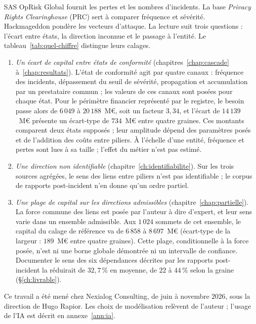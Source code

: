 \begin{samepage}
SAS OpRisk Global fournit les pertes et les nombres d'incidents. La base \emph{Privacy Rights
Clearinghouse} (PRC) sert à comparer fréquence et sévérité. Hackmageddon pondère les vecteurs
d'attaque. La lecture suit trois questions : l'écart entre états, la direction inconnue et
le passage à l'entité. Le tableau~\ref{tab:quel-chiffre} distingue leurs calages.\par
\end{samepage}

\begin{enumerate}[leftmargin=*,nosep]
\item \emph{Un écart de capital entre états de conformité} (chapitres~\ref{chap:cascade} à~\ref{chap:resultats}). L'état de conformité agit par quatre canaux : fréquence des incidents,
dépassement du seuil de sévérité, propagation et accumulation par un prestataire commun ; les
valeurs de ces canaux sont posées pour chaque état. Pour le périmètre financier représenté par le
registre, le besoin
passe alors de $6\,049$ à $20\,188$~M\euro{}, soit un facteur $3{,}34$, et l'écart de
$14\,139$~M\euro{} présente un écart-type de $734$~M\euro{} entre quatre graines. Ces montants
comparent deux états supposés ; leur amplitude dépend des paramètres posés et de l'addition des
coûts entre piliers. À l'échelle d'une entité, fréquence et pertes sont
lues à sa taille ; l'effet du métier n'est pas estimé.
\item \emph{Une direction non identifiable} (chapitre~\ref{ch:identifiabilite}). Sur les trois sources agrégées, le sens des liens entre piliers
n'est pas identifiable ; le corpus de rapports post-incident n'en
donne qu'un ordre partiel.
\item \emph{Une plage de capital sur les directions admissibles} (chapitre~\ref{chap:partielle}). La force commune des liens est
posée par l'auteur à dire d'expert, et leur sens varie dans un ensemble admissible. Aux $1\,024$ sommets de cet
ensemble, le capital du calage de référence va de $6\,858$ à $8\,697$~M\euro{} (écart-type de la
largeur : $189$~M\euro{} entre quatre graines). Cette plage, conditionnelle à la force posée, n'est
ni une borne globale démontrée ni un intervalle de confiance. Documenter le sens des six
dépendances décrites par les rapports post-incident la réduirait de $32{,}7\,\%$ en moyenne, de
$22$ à $44\,\%$ selon la graine (\S\ref{ch:livrable}).
\end{enumerate}

Ce travail a été mené chez Nexialog Consulting, de juin à novembre $2026$, sous la direction de Hugo
Rapior. Les choix de modélisation relèvent de l'auteur ; l'usage de l'IA est décrit en annexe~\ref{ann:ia}.
